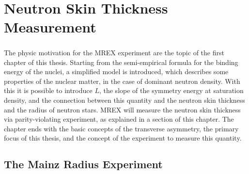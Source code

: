 
\chapter{Neutron Skin Thickness Measurement} \label{intro}

\paragraph{}
The physic motivation for the MREX experiment are the topic of the first chapter of this thesis. Starting from the semi-empirical formula for the binding energy of the nuclei, a simplified model is introduced, which describes some properties of the nuclear matter, in the case of dominant neutron density. With this it is possible to introduce $L$, the slope of the symmetry energy at saturation density, and the connection between this quantity and the neutron skin thickness and the radius of neutron stars. MREX will measure the neutron skin thickness via parity-violating experiment, as explained in a section of this chapter. The chapter ends with the basic concepts of the transverse asymmetry, the primary focus of this thesis, and the concept of the experiment to measure this quantity.

\section{The Mainz Radius Experiment}

